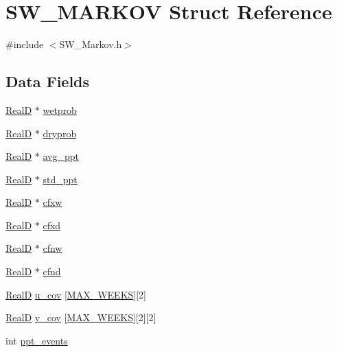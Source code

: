 \hypertarget{struct_s_w___m_a_r_k_o_v}{}\section{S\+W\+\_\+\+M\+A\+R\+K\+OV Struct Reference}
\label{struct_s_w___m_a_r_k_o_v}


{\ttfamily \#include $<$S\+W\+\_\+\+Markov.\+h$>$}

\subsection*{Data Fields}
\begin{DoxyCompactItemize}
\item 
\hyperlink{generic_8h_af1c105fd5732f70b91ddaeda0cc340e3}{RealD} $\ast$ \hyperlink{struct_s_w___m_a_r_k_o_v_a0d300351fc442fd7cc9e99120cd24eb6}{wetprob}
\item 
\hyperlink{generic_8h_af1c105fd5732f70b91ddaeda0cc340e3}{RealD} $\ast$ \hyperlink{struct_s_w___m_a_r_k_o_v_aa40f66a41ed1c308e8032b8065b30a4a}{dryprob}
\item 
\hyperlink{generic_8h_af1c105fd5732f70b91ddaeda0cc340e3}{RealD} $\ast$ \hyperlink{struct_s_w___m_a_r_k_o_v_afe0733ac0a0dd4349cdb576c143fc6ce}{avg\+\_\+ppt}
\item 
\hyperlink{generic_8h_af1c105fd5732f70b91ddaeda0cc340e3}{RealD} $\ast$ \hyperlink{struct_s_w___m_a_r_k_o_v_aab76285bb8aafa89e3fa56340962d9a1}{std\+\_\+ppt}
\item 
\hyperlink{generic_8h_af1c105fd5732f70b91ddaeda0cc340e3}{RealD} $\ast$ \hyperlink{struct_s_w___m_a_r_k_o_v_a888f68abbef835953b6775730a65652c}{cfxw}
\item 
\hyperlink{generic_8h_af1c105fd5732f70b91ddaeda0cc340e3}{RealD} $\ast$ \hyperlink{struct_s_w___m_a_r_k_o_v_ad8e63c0c85d5abe16a03d7ee008bdb0b}{cfxd}
\item 
\hyperlink{generic_8h_af1c105fd5732f70b91ddaeda0cc340e3}{RealD} $\ast$ \hyperlink{struct_s_w___m_a_r_k_o_v_a8362112fd3d01a56ef16fb02b6922577}{cfnw}
\item 
\hyperlink{generic_8h_af1c105fd5732f70b91ddaeda0cc340e3}{RealD} $\ast$ \hyperlink{struct_s_w___m_a_r_k_o_v_a7d55c486248a4f5546971939dc655d93}{cfnd}
\item 
\hyperlink{generic_8h_af1c105fd5732f70b91ddaeda0cc340e3}{RealD} \hyperlink{struct_s_w___m_a_r_k_o_v_aef7204f999937d1b8f98310278c8e41c}{u\+\_\+cov} \mbox{[}\hyperlink{_times_8h_a424fe822ecd3e435c4d8dd339b57d829}{M\+A\+X\+\_\+\+W\+E\+E\+KS}\mbox{]}\mbox{[}2\mbox{]}
\item 
\hyperlink{generic_8h_af1c105fd5732f70b91ddaeda0cc340e3}{RealD} \hyperlink{struct_s_w___m_a_r_k_o_v_ac099b7578186299eae03a07324ae3948}{v\+\_\+cov} \mbox{[}\hyperlink{_times_8h_a424fe822ecd3e435c4d8dd339b57d829}{M\+A\+X\+\_\+\+W\+E\+E\+KS}\mbox{]}\mbox{[}2\mbox{]}\mbox{[}2\mbox{]}
\item 
int \hyperlink{struct_s_w___m_a_r_k_o_v_a1814b8674d464bb662cd4cc378f0311a}{ppt\+\_\+events}
\end{DoxyCompactItemize}


